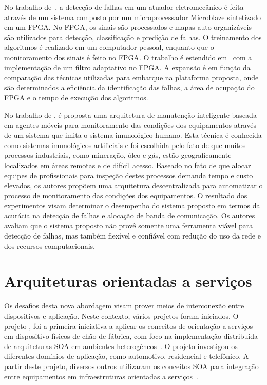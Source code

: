 \iffalse
Em~\cite{iung2009conceptual}, um \textit{framework} conceitual para integração entre as diferentes
tecnologias de \textit{e-maintenance} é proposto.
\fi

No trabalho de~\cite{goncalves2009design}, a detecção de falhas em um atuador eletromecânico é feita
através de um sistema composto por um microprocessador Microblaze sintetizado em um \gls{FPGA}. No
\gls{FPGA}, os sinais são processados e mapas auto-organizáveis são utilizados para detecção,
classificação e predição de falhas. O treinamento dos algoritmos é realizado em um computador
pessoal, enquanto que o monitoramento dos sinais é feito no \gls{FPGA}. O trabalho é estendido
em~\cite{goncalves2011desenvolvimento} com a implementação de um filtro adaptativo no \gls{FPGA}. A
expansão é em função da comparação das técnicas utilizadas para embarque na plataforma proposta,
onde são determinados a eficiência da identificação das falhas, a área de ocupação do \gls{FPGA} e o
tempo de execução dos algoritmos.

No trabalho de \cite{hua2013mobile}, é proposta uma arquitetura de manutenção inteligente baseada em
agentes móveis para monitoramento das condições dos equipamentos através de um sistema que imita o
sistema imunológico humano. Esta técnica é conhecida como sistemas imunológicos artificiais e foi
escolhida pelo fato de que muitos processos industriais, como mineração, óleo e gás, estão
geograficamente localizados em áreas remotas e de difícil acesso. Baseado no fato de que alocar
equipes de profissionais para inspeção destes processos demanda tempo e custo elevados, os autores
propõem uma arquitetura descentralizada para automatizar o processo de monitoramento das condições
dos equipamentos. O resultado dos experimentos visam determinar o desempenho do sistema proposto em
termos da acurácia na detecção de falhas e alocação de banda de comunicação. Os autores avaliam que
o sistema proposto não provê somente uma ferramenta viável para detecção de falhas, mas também
flexível e confiável com redução do uso da rede e dos recursos computacionais.


\section{Arquiteturas orientadas a serviços}


Os desafios desta nova abordagem visam prover meios de interconexão entre dispositivos e aplicação.
Neste contexto, vários projetos foram iniciados. O projeto
, foi a primeira iniciativa a aplicar os conceitos de
orientação a serviços em dispositivo físicos de chão de fábrica, com foco na implementação
distribuída de arquiteturas \gls{SOA} em ambientes heterogêneos~\cite{jammes2005service}. O projeto
investigou os diferentes domínios de aplicação, como automotivo, residencial e telefônico. A partir
deste projeto, diversos outros utilizaram os conceitos \gls{SOA} para integração entre equipamentos
em infraestruturas orientadas a serviços~\cite{zeeb2007service}.

